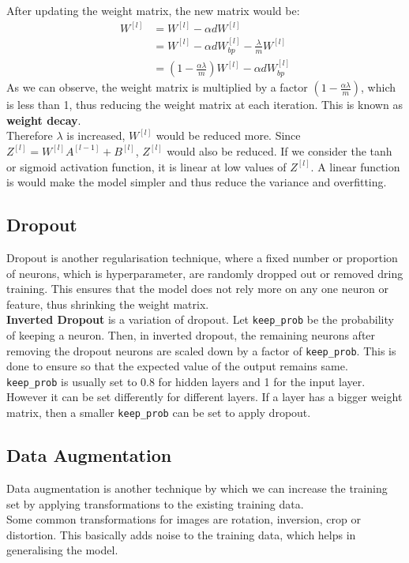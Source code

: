 \documentclass[12pt]{article}
\begin{document}
\newpage
After updating the weight matrix, the new matrix would be:
\begin{equation}
    \begin{aligned}
        W^{[l]} & = W^{[l]} - \alpha dW^{[l]}\\
          & = W^{[l]} - \alpha dW^{[l]}_{bp} - \frac{\lambda}{m} W^{[l]}\\
          & = (1-\frac{\alpha \lambda}{m})W^{[l]} - \alpha dW^{[l]}_{bp}
      \end{aligned}
\end{equation}
As we can observe, the weight matrix is multiplied by a factor $(1-\frac{\alpha \lambda}{m})$, which is less than 1, thus reducing the weight matrix at each iteration. This is known as \textbf{weight decay}.\\
Therefore $\lambda$ is increased, $W^{[l]}$ would be reduced more. Since $Z^{[l]} = W^{[l]}A^{[l-1]} + B^{[l]}$, $Z^{[l]}$ would also be reduced. If we consider the tanh or sigmoid activation function, it is linear at low values of $Z^{[l]}$. A linear function is would make the model simpler and thus reduce the variance and overfitting.\\
\subsection{Dropout}
Dropout is another regularisation technique, where a fixed number or proportion of neurons, which is hyperparameter, are randomly dropped out or removed dring training. This ensures that the model does not rely more on any one neuron or feature, thus shrinking the weight matrix.\\
\textbf{Inverted Dropout} is a variation of dropout. Let \texttt{keep\_prob} be the probability of keeping a neuron. Then, in inverted dropout, the remaining neurons after removing the dropout neurons are scaled down by a factor of \texttt{keep\_prob}. This is done to ensure so that the expected value of the output remains same.\\
\texttt{keep\_prob} is usually set to 0.8 for hidden layers and 1 for the input layer. However it can be set differently for different layers. If a layer has a bigger weight matrix, then a smaller \texttt{keep\_prob} can be set to apply dropout.\\


\subsection{Data Augmentation}
Data augmentation is another technique by which we can increase the training set by applying transformations to the existing training data. \\
Some common transformations for images are rotation, inversion, crop or distortion. This basically adds noise to the training data, which helps in generalising the model.\\
\end{document}
